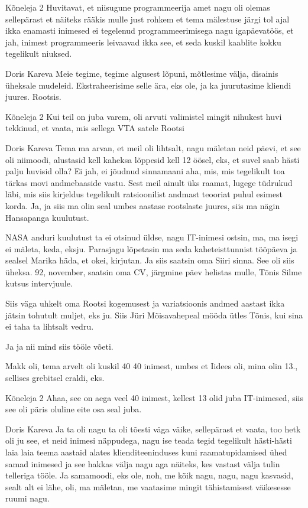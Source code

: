 Kõneleja 2
Huvitavat, et niisugune programmeerija amet nagu oli olemas sellepärast et näiteks rääkis mulle just rohkem et tema mälestuse järgi tol ajal ikka enamasti inimesed ei tegelenud programmeerimisega nagu igapäevatöös, et jah, inimest programmeeris leivaavad ikka see, et seda kuskil kaablite kokku tegelikult niuksed. 

Doris Kareva
Meie tegime, tegime algusest lõpuni, mõtlesime välja, disainis üheksale mudeleid. Ekstraheerisime selle ära, eks ole, ja ka juurutasime kliendi juures. Rootsis. 

Kõneleja 2
Kui teil on juba varem, oli arvuti valimistel mingit nihukest huvi tekkinud, et vaata, mis sellega VTA satele Rootsi 

Doris Kareva
Tema ma arvan, et meil oli lihtsalt, nagu mäletan neid päevi, et see oli niimoodi, alustasid kell kaheksa lõppesid kell 12 öösel, eks, et suvel saab hästi palju huvisid olla? Ei jah, ei jõudnud sinnamaani aha, mis, mis tegelikult toa tärkas movi andmebaaside vastu. Sest meil ainult üks raamat, lugege tüdrukud läbi, mis siis kirjeldus tegelikult ratsioonilist andmast teooriat puhul esimest korda. Ja, ja siis ma olin seal umbes aastase rootslaste juures, siis ma nägin Hansapanga kuulutust. 

NASA anduri kuulutust ta ei otsinud üldse, nagu IT-inimesi ostsin, ma, ma isegi ei mäleta, keda, eksju. Parasjagu lõpetasin ma seda kaheteisttunnist tööpäeva ja sealsel Marika häda, et okei, kirjutan. Ja siis saatsin oma Siiri sinna. See oli siis üheksa. 92, november, saatsin oma CV, järgmine päev helistas mulle, Tõnis Silme kutsus intervjuule. 

Siis väga uhkelt oma Rootsi kogemusest ja variatsioonis andmed aastast ikka jätsin tohutult muljet, eks ju. Siis Jüri Mõisavahepeal mööda ütles Tõnis, kui sina ei taha ta lihtsalt vedru. 

Ja ja nii mind siis tööle võeti. 

Makk oli, tema arvelt oli kuskil 40 40 inimest, umbes et Iidees oli, mina olin 13., sellises grebitsel eraldi, eks. 

Kõneleja 2
Ahaa, see on aega veel 40 inimest, kellest 13 olid juba IT-inimesed, siis see oli päris oluline eite osa seal juba. 

Doris Kareva
Ja ta oli nagu ta oli tõesti väga väike, sellepärast et vaata, too hetk oli ju see, et neid inimesi näppudega, nagu ise teada tegid tegelikult hästi-hästi laia laia teema aastaid alates klienditeeninduses kuni raamatupidamised ühed samad inimesed ja see hakkas välja nagu aga näiteks, kes vastast välja tulin telleriga tööle. Ja samamoodi, eks ole, noh, me kõik nagu, nagu, nagu kasvasid, sealt alt ei lähe, oli, ma mäletan, me vaatasime mingit tähistamisest väikesesse ruumi nagu. 

